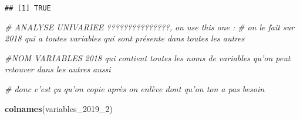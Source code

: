 \documentclass[
]{article}
\newenvironment{Shaded}{\begin{snugshade}}{\end{snugshade}}
\newcommand{\CommentTok}[1]{\textcolor[rgb]{0.56,0.35,0.01}{\textit{#1}}}
\newcommand{\DataTypeTok}[1]{\textcolor[rgb]{0.13,0.29,0.53}{#1}}
\newcommand{\DecValTok}[1]{\textcolor[rgb]{0.00,0.00,0.81}{#1}}
\newcommand{\KeywordTok}[1]{\textcolor[rgb]{0.13,0.29,0.53}{\textbf{#1}}}
\newcommand{\NormalTok}[1]{#1}
\newcommand{\OperatorTok}[1]{\textcolor[rgb]{0.81,0.36,0.00}{\textbf{#1}}}
\newcommand{\StringTok}[1]{\textcolor[rgb]{0.31,0.60,0.02}{#1}}
\begin{document}
\begin{Shaded}
\end{Shaded}

\begin{verbatim}
## [1] TRUE
\end{verbatim}

\begin{Shaded}
\begin{Highlighting}[]
\CommentTok{# ANALYSE UNIVARIEE ???????????????, on use this one :}
\CommentTok{# on le fait sur 2018 qui a toutes variables qui sont présente dans toutes les autres}




\CommentTok{#NOM VARIABLES 2018 qui contient toutes les noms de variables qu'on peut retouver dans les autres aussi}

\CommentTok{# donc c'est ça qu'on copie après on enlève dont qu'on ton a pas besoin}

\KeywordTok{colnames}\NormalTok{(variables_}\DecValTok{2019}\NormalTok{_}\DecValTok{2}\NormalTok{)}
\end{Highlighting}
\end{Shaded}
\end{document}
